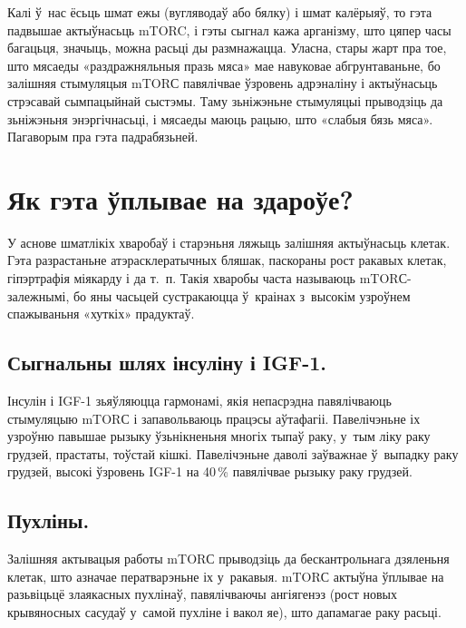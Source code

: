 
Калі ў~нас ёсьць шмат ежы (вугляводаў або бялку) і шмат калёрыяў, то гэта падвышае актыўнасьць mTORC, і гэты сыгнал кажа арганізму, што цяпер часы багацьця, значыць, можна расьці ды размнажацца. Уласна, стары жарт пра тое, што мясаеды «раздражняльныя празь мяса» мае навуковае абгрунтаваньне, бо залішняя стымуляцыя mTORС павялічвае ўзровень адрэналіну і актыўнасьць стрэсавай сымпацыйнай сыстэмы. Таму зьніжэньне стымуляцыі прыводзіць да зьніжэньня энэргічнасьці, і мясаеды маюць рацыю, што «слабыя бязь мяса». Пагаворым пра гэта падрабязьней.

\section{Як гэта ўплывае на здароўе?}

У аснове шматлікіх хваробаў і старэньня ляжыць залішняя актыўнасьць клетак. Гэта разрастаньне атэрасклератычных бляшак, паскораны рост ракавых клетак, гіпэртрафія міякарду і да т.~п. Такія хваробы часта называюць mTORС-залежнымі, бо яны часьцей сустракаюцца ў~краінах з~высокім узроўнем спажываньня «хуткіх» прадуктаў.

\subsection{Сыгнальны шлях інсуліну і IGF-1.}
Інсулін і IGF-1 зьяўляюцца гармонамі, якія непасрэдна павялічваюць стымуляцыю mTORС і запавольваюць працэсы аўтафагіі. Павелічэньне іх узроўню павышае рызыку ўзьнікненьня многіх тыпаў раку, у~тым ліку раку грудзей, прастаты, тоўстай кішкі. Павелічэньне даволі заўважнае ў~выпадку раку грудзей, высокі ўзровень IGF-1 на 40\,\% павялічвае рызыку раку грудзей.

\subsection{Пухліны.}
Залішняя актывацыя работы mTORС прыводзіць да бескантрольнага дзяленьня клетак, што азначае ператварэньне іх у~ракавыя. mTORС актыўна ўплывае на разьвіцьцё злаякасных пухлінаў, павялічваючы ангіягенэз (рост новых крывяносных сасудаў у~самой пухліне і вакол яе), што дапамагае раку расьці.

